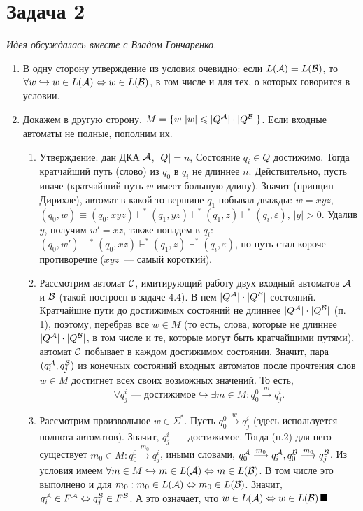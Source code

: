 \documentclass[a4paper]{article}
\def\A{{\cal A}}
\def\B{{\cal B}}
\def\C{{\cal C}}
\begin{document}
\section*{Задача 2}
{\em{Идея обсуждалась вместе с Владом Гончаренко.}}
\begin{enumerate}[1.]
\item В одну сторону утверждение из условия очевидно: если $L(\A)=L(\B)$, то $\forall w\hookrightarrow w\in L(\A)\Leftrightarrow w\in L(\B)$, в том числе и для тех, о которых говорится в условии.
\item Докажем в другую сторону. $M=\{w\big ||w|\leqslant |Q^\A|\cdot |Q^\B|\}$. Если входные автоматы не полные, пополним их.
\begin{enumerate}[1.]
\item Утверждение: дан ДКА $\A$, $|Q|=n$, Состояние $q_i\in Q$ достижимо. Тогда кратчайший путь (слово) из $q_0$ в $q_i$ не длиннее $n$. Действительно, пусть иначе (кратчайший путь $w$ имеет большую длину). Значит (принцип Дирихле), автомат в какой-то вершине $q_1$ побывал дважды:  $w=xyz$, $(q_0,w)\equiv(q_0,xyz)\vdash^*(q_1,yz)\vdash^*(q_1,z)\vdash^*(q_i,\varepsilon)$, $|y|>0$. Удалив $y$, получим $w'=xz$, также попадем в $q_i$: $(q_0,w')\equiv^*(q_0,xz)\vdash^*(q_1,z)\vdash^*(q_i,\varepsilon)$, но путь стал короче~--- противоречие ($xyz$~--- самый короткий).
\item Рассмотрим автомат $\C$, имитирующий работу двух входный автоматов $\A$ и $\B$ (такой построен в задаче 4.4). В нем $|Q^\A| \cdot |Q^\B|$ состояний. Кратчайшие пути до достижимых состояний не длиннее $|Q^\A| \cdot |Q^\B|$ (п. 1), поэтому, перебрав все $w\in M$ (то есть, слова, которые не длиннее $|Q^\A| \cdot |Q^\B|$, в том числе и те, которые могут быть кратчайшими путями), автомат $\C$ побывает в каждом достижимом состоянии. Значит, пара $(q^\A_i,q^\B_j)$ из конечных состояний входных автоматов после прочтения слов $w\in M$ достигнет всех своих возможных значений. То есть, $$\forall q^i_j\mbox{~--- достижимое}\hookrightarrow\exists m\in M\colon q^0_0\overset{m}{\longrightarrow}q^i_j.$$
\item Рассмотрим произвольное $w\in\Sigma^*$. Пусть $q^0_0\overset{w}{\longrightarrow}q^i_j$ (здесь используется полнота автоматов). Значит, $q^i_j$~--- достижимое. Тогда (п.2) для него существует $m_0\in M\colon q^0_0\overset{m_0}{\longrightarrow}q^i_j$, иными словами, $q^\A_0\overset{m_0}{\longrightarrow}q^\A_i,q^\B_0\overset{m_0}{\longrightarrow}q^\B_j$.\newline
Из условия имеем $\forall m\in M\hookrightarrow m\in L(\A)\Leftrightarrow m\in L(\B)$. В том числе это выполнено и для $m_0: m_0\in L(\A)\Leftrightarrow m_0\in L(\B)$. Значит, $q^\A_i\in F^\A\Leftrightarrow q^\B_j\in F^\B$. А это означает, что $w\in L(\A)\Leftrightarrow w\in L(\B)\,\blacksquare$
\end{enumerate}
\end{enumerate}
\newpage
\end{document}
